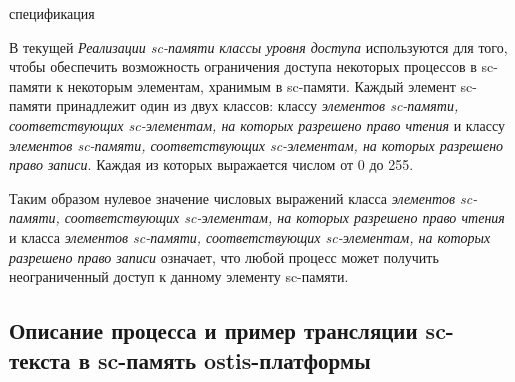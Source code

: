 \begin{SCn}
\begin{scnrelfromset}{спецификация}
\end{scnrelfromset}
\end{SCn}

В текущей \textit{Реализации sc-памяти} \textit{классы уровня доступа} используются для того, чтобы обеспечить возможность ограничения доступа некоторых процессов в sc-памяти к некоторым элементам, хранимым в sc-памяти. Каждый элемент sc-памяти принадлежит один из двух классов: классу \textit{элементов sc-памяти, соответствующих sc-элементам, на которых разрешено право чтения} и классу \textit{элементов sc-памяти, соответствующих sc-элементам, на которых разрешено право записи}. Каждая из которых выражается числом от 0 до 255.

Таким образом нулевое значение числовых выражений класса \textit{элементов sc-памяти, соответствующих sc-элементам, на которых разрешено право чтения} и класса \textit{элементов sc-памяти, соответствующих sc-элементам, на которых разрешено право записи} означает, что любой процесс может получить неограниченный доступ к данному элементу sc-памяти.

\subsection{Описание процесса и пример трансляции sc-текста в sc-память ostis-платформы}
\label{sec_soft_platform_scin_code_example}

